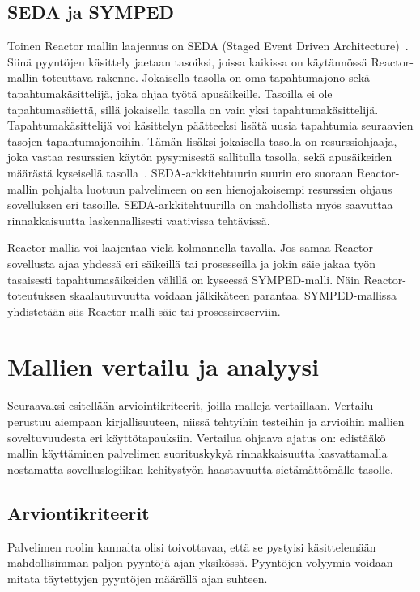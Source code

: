 \documentclass[finnish]{tktltiki2}
\theoremstyle{definition}
\theoremstyle{remark}
\begin{document}
\subsection{SEDA ja SYMPED}

Toinen Reactor mallin laajennus on SEDA (Staged Event Driven Architecture)~\cite{welsh_seda_2001}.
Siinä pyyntöjen käsittely jaetaan tasoiksi, joissa kaikissa on
käytännössä Reactor-mallin toteuttava rakenne. Jokaisella tasolla
on oma tapahtumajono sekä tapahtumakäsittelijä, joka ohjaa työtä
apusäikeille. Tasoilla ei ole tapahtumasäiettä, sillä
jokaisella tasolla on vain yksi tapahtumakäsittelijä.
Tapahtumakäsittelijä voi käsittelyn päätteeksi
lisätä uusia tapahtumia seuraavien tasojen tapahtumajonoihin.
Tämän lisäksi jokaisella tasolla on resurssiohjaaja,
joka vastaa resurssien käytön pysymisestä sallitulla tasolla,
sekä apusäikeiden määrästä kyseisellä tasolla~\cite{welsh_seda_2001}.
SEDA-arkkitehtuurin suurin ero suoraan Reactor-mallin pohjalta luotuun
palvelimeen on sen hienojakoisempi resurssien ohjaus sovelluksen eri tasoille.
SEDA-arkkitehtuurilla on mahdollista myös saavuttaa rinnakkaisuutta
laskennallisesti vaativissa tehtävissä.

Reactor-mallia voi laajentaa vielä kolmannella tavalla.
Jos samaa Reactor-sovellusta ajaa yhdessä eri säikeillä tai prosesseilla
ja jokin säie jakaa työn tasaisesti tapahtumasäikeiden välillä
on kyseessä SYMPED-malli. Näin Reactor-toteutuksen
skaalautuvuutta voidaan jälkikäteen parantaa.
SYMPED-mallissa yhdistetään siis Reactor-malli säie-tai prosessireserviin.


\section{Mallien vertailu ja analyysi}\label{sec:vertailu}
Seuraavaksi esitellään arviointikriteerit,
joilla malleja vertaillaan.
Vertailu perustuu aiempaan kirjallisuuteen, niissä
tehtyihin testeihin ja arvioihin
mallien soveltuvuudesta eri
käyttötapauksiin.
Vertailua ohjaava ajatus on:
edistääkö mallin käyttäminen palvelimen
suorituskykyä rinnakkaisuutta kasvattamalla
nostamatta sovelluslogiikan kehitystyön haastavuutta
sietämättömälle tasolle.

\subsection{Arviontikriteerit}

Palvelimen roolin kannalta olisi toivottavaa, että
se pystyisi käsittelemään mahdollisimman paljon pyyntöjä
ajan yksikössä. Pyyntöjen volyymia voidaan
mitata täytettyjen pyyntöjen määrällä ajan suhteen.
\end{document}
